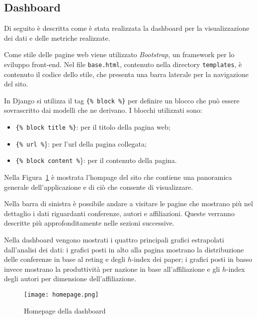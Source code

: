 
\subsection{Dashboard}
Di seguito è descritta come è stata realizzata la dashboard per la visualizzazione dei dati e delle metriche realizzate.

Come stile delle pagine web viene utilizzato \textit{Bootstrap}, un framework per lo sviluppo front-end. 
Nel file \texttt{base.html}, contenuto nella directory \texttt{templates}, è contenuto il codice dello stile, che presenta una barra laterale per la navigazione del sito.

In Django si utilizza il tag \texttt{\{\% block \%\}} per definire un blocco che può essere sovrascritto dai modelli che ne derivano. I blocchi utilizzati sono:

\begin{itemize}
  \item \texttt{\{\% block title \%\}}: per il titolo della pagina web;
  \item \texttt{\{\% url \%}\}: per l'url della pagina collegata;
  \item \texttt{\{\% block content \%}\}: per il contenuto della pagina.
\end{itemize}

Nella Figura~\ref{fig:homepage} è mostrata l'hompage del sito che contiene una panoramica generale dell'applicazione e di ciò che consente di visualizzare.

Nella barra di sinistra è possibile andare a visitare le pagine che mostrano più nel dettaglio i dati riguardanti conferenze, autori e affiliazioni. Queste verranno descritte più approfonditamente nelle sezioni successive.

Nella dashboard vengono mostrati i quattro principali grafici estrapolati dall'analisi dei dati: i grafici posti in alto alla pagina mostrano la distribuzione delle conferenze in base al reting e degli $h$-index dei paper; i grafici posti in basso invece mostrano la produttività per nazione in base all'affiliazione e gli $h$-index degli autori per dimensione dell'affiliazione.

\begin{figure}
  \centering
  \texttt{[image: homepage.png]}
  \caption{Homepage della dashboard}
  \label{fig:homepage}
\end{figure}

